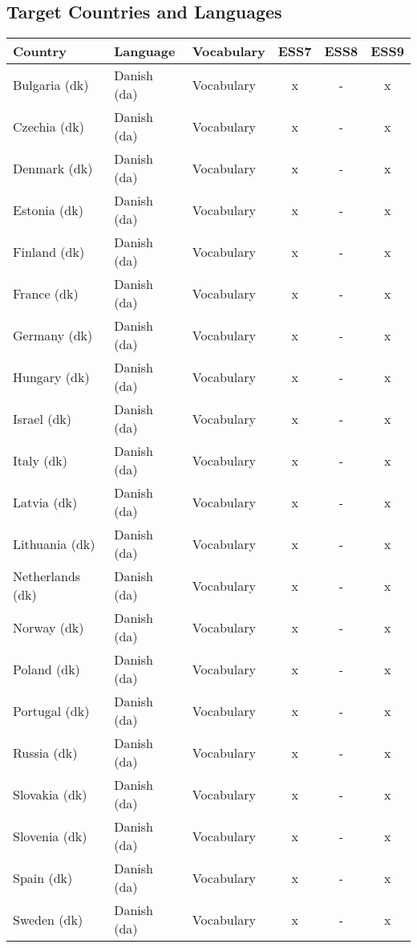 \begin{table*}[p]
\section{Target Countries and Languages}
\centering
    \begin{tabular}{|l|l|l|c|c|c|}
        \hline
        Country          & Language        & Vocabulary & ESS7 & ESS8 & ESS9 \\ \hline
        Bulgaria    (dk) & Danish     (da) & Vocabulary & x    & -    & x    \\ \hline
        Czechia     (dk) & Danish     (da) & Vocabulary & x    & -    & x    \\ \hline
        Denmark     (dk) & Danish     (da) & Vocabulary & x    & -    & x    \\ \hline
        Estonia     (dk) & Danish     (da) & Vocabulary & x    & -    & x    \\ \hline
        Finland     (dk) & Danish     (da) & Vocabulary & x    & -    & x    \\ \hline
        France      (dk) & Danish     (da) & Vocabulary & x    & -    & x    \\ \hline
        Germany     (dk) & Danish     (da) & Vocabulary & x    & -    & x    \\ \hline
        Hungary     (dk) & Danish     (da) & Vocabulary & x    & -    & x    \\ \hline
        Israel      (dk) & Danish     (da) & Vocabulary & x    & -    & x    \\ \hline
        Italy       (dk) & Danish     (da) & Vocabulary & x    & -    & x    \\ \hline
        Latvia      (dk) & Danish     (da) & Vocabulary & x    & -    & x    \\ \hline
        Lithuania   (dk) & Danish     (da) & Vocabulary & x    & -    & x    \\ \hline
        Netherlands (dk) & Danish     (da) & Vocabulary & x    & -    & x    \\ \hline
        Norway      (dk) & Danish     (da) & Vocabulary & x    & -    & x    \\ \hline
        Poland      (dk) & Danish     (da) & Vocabulary & x    & -    & x    \\ \hline
        Portugal    (dk) & Danish     (da) & Vocabulary & x    & -    & x    \\ \hline
        Russia      (dk) & Danish     (da) & Vocabulary & x    & -    & x    \\ \hline
        Slovakia    (dk) & Danish     (da) & Vocabulary & x    & -    & x    \\ \hline
        Slovenia    (dk) & Danish     (da) & Vocabulary & x    & -    & x    \\ \hline
        Spain       (dk) & Danish     (da) & Vocabulary & x    & -    & x    \\ \hline
        Sweden      (dk) & Danish     (da) & Vocabulary & x    & -    & x    \\ \hline
    \end{tabular}
\end{table*}
